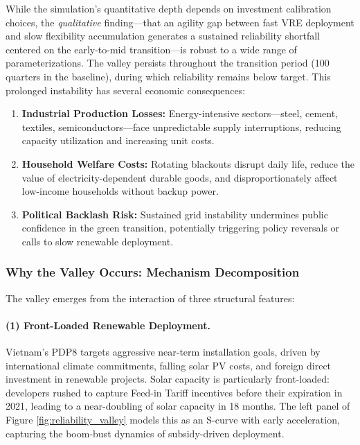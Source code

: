 \documentclass[12pt, a4paper]{article}
\begin{document}
While the simulation's quantitative depth depends on investment calibration choices, the \textit{qualitative} finding---that an agility gap between fast VRE deployment and slow flexibility accumulation generates a sustained reliability shortfall centered on the early-to-mid transition---is robust to a wide range of parameterizations. The valley persists throughout the transition period (100 quarters in the baseline), during which reliability remains below target. This prolonged instability has several economic consequences:

\begin{enumerate}
\item \textbf{Industrial Production Losses:} Energy-intensive sectors---steel, cement, textiles, semiconductors---face unpredictable supply interruptions, reducing capacity utilization and increasing unit costs.
\item \textbf{Household Welfare Costs:} Rotating blackouts disrupt daily life, reduce the value of electricity-dependent durable goods, and disproportionately affect low-income households without backup power.
\item \textbf{Political Backlash Risk:} Sustained grid instability undermines public confidence in the green transition, potentially triggering policy reversals or calls to slow renewable deployment.
\end{enumerate}

\subsubsection{Why the Valley Occurs: Mechanism Decomposition}

The valley emerges from the interaction of three structural features:

\paragraph{(1) Front-Loaded Renewable Deployment.} Vietnam's PDP8 targets aggressive near-term installation goals, driven by international climate commitments, falling solar PV costs, and foreign direct investment in renewable projects. Solar capacity is particularly front-loaded: developers rushed to capture Feed-in Tariff incentives before their expiration in 2021, leading to a near-doubling of solar capacity in 18 months. The left panel of Figure \ref{fig:reliability_valley} models this as an S-curve with early acceleration, capturing the boom-bust dynamics of subsidy-driven deployment.
\end{document}

